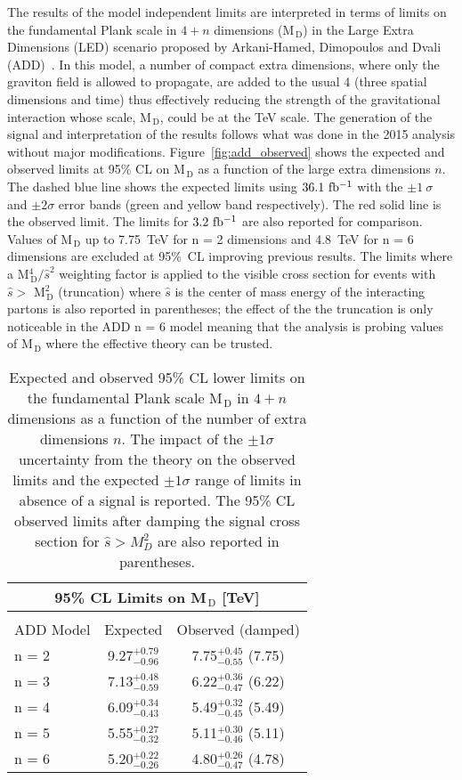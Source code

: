 The results of the model independent limits are interpreted in terms of limits
on the fundamental Plank scale in $4 + n$ dimensions (M$_\mathrm{\, D}$) in the
Large Extra Dimensions (LED) scenario proposed by Arkani-Hamed, Dimopoulos and
Dvali (ADD)~\cite{ADDPaper}. In this model, a number of compact extra
dimensions, where only the graviton field is allowed to propagate, are added to
the usual 4 (three spatial dimensions and time) thus effectively reducing the
strength of the gravitational interaction whose scale, M$_\mathrm{\, D}$, could
be at the TeV scale. The generation of the signal and interpretation of the
results follows what was done in the 2015 analysis without major
modifications. Figure~\ref{fig:add_observed} shows the expected and observed
limits at 95\% CL on M$_\mathrm{\, D}$ as a function of the large extra
dimensions $n$. The dashed blue line shows the expected limits using $36.1~\mbox{fb$^{-1}$}$
with the $\pm 1~\sigma$ and $\pm 2 \sigma$ error bands (green and yellow band
respectively). The red solid line is the observed limit. The limits for
$3.2~\mbox{fb$^{-1}$}$ are also reported for comparison. Values of M$_\mathrm{\, D}$ up to
7.75~TeV for n = 2 dimensions and 4.8~TeV for n = 6 dimensions are excluded at
95\%~CL improving previous results. The limits where a
M$^4_\mathrm{\, D} / \hat{s}^2$ weighting factor is applied to the visible cross
section for events with $\hat{s} > $ M$^2_\mathrm{\, D}$ (truncation) where
$\hat{s}$ is the center of mass energy of the interacting partons is also
reported in parentheses; the effect of the the truncation is only noticeable in
the ADD n = 6 model meaning that the analysis is probing values of
M$_\mathrm{\, D}$ where the effective theory can be trusted.
\begin{table}[!hb]
  \centering
  \begin{tabular}{lcc}
    \toprule
    \multicolumn{3}{c}{95\% CL Limits on M$_\mathrm{\, D}$
    [TeV]} \\
    \midrule \midrule \\
    ADD Model & Expected & Observed (damped) \\
    n = 2 & 9.27$^{+0.79}_{-0.96}$ & 7.75$^{+0.45}_{-0.55}$ (7.75) \B \\
    n = 3 & 7.13$^{+0.48}_{-0.59}$ & 6.22$^{+0.36}_{-0.47}$ (6.22) \T \B \\
    n = 4 & 6.09$^{+0.34}_{-0.43}$ & 5.49$^{+0.32}_{-0.45}$ (5.49) \T \B \\
    n = 5 & 5.55$^{+0.27}_{-0.32}$ & 5.11$^{+0.30}_{-0.46}$ (5.11) \T \B \\
    n = 6 & 5.20$^{+0.22}_{-0.26}$ & 4.80$^{+0.26}_{-0.47}$ (4.78) \T \\
    \bottomrule
  \end{tabular}
  \caption{Expected and observed 95\% CL lower limits on the fundamental Plank
      scale M$_\mathrm{\, D}$ in $4 + n$ dimensions as a function of the number
      of extra dimensions $n$. The impact of the $\pm 1 \sigma$ uncertainty from
      the theory on the observed limits and the expected $\pm 1 \sigma$ range of
      limits in absence of a signal is reported. The 95\% CL observed limits
      after damping the signal cross section for $\hat{s} > M_D^2$ are also
      reported in parentheses.}
  \label{tab:add_limits}
\end{table}
